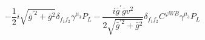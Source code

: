 %
\begin{dmath*}
%
  -  \frac{1}{2} i \sqrt{{\bar g}^{\prime 2} + {\bar g}{}^2}\delta_{f_1 f_2} \gamma^{\mu_3} P_L  -  \frac{i {\bar g}^\prime {\bar g}{} v^2}{2 \sqrt{{\bar g}^{\prime 2} + {\bar g}{}^2}}\delta_{f_1 f_2} C^{ \varphi  WB} \gamma^{\mu_3} P_L
%
\end{dmath*}
%
